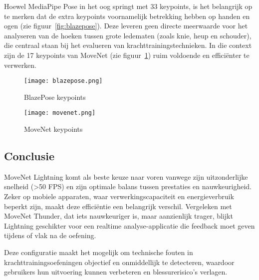 Hoewel MediaPipe Pose in het oog springt met 33 keypoints, is het belangrijk op te merken dat de extra keypoints voornamelijk betrekking hebben op handen en ogen (zie figuur~\ref{fig:blazepose}). 
Deze leveren geen directe meerwaarde voor het analyseren van de hoeken tussen grote ledematen (zoals knie, heup en schouder), die centraal staan bij het evalueren van krachttrainingstechnieken. 
In die context zijn de 17 keypoints van MoveNet (zie figuur~\ref{fig:movenet}) ruim voldoende en efficiënter te verwerken.

\begin{figure}[h]
  \centering
  \begin{minipage}{0.45\textwidth}
      \centering
      \texttt{[image: blazepose.png]}
      \caption[BlazePose keypoints]{\label{fig:blazepose}BlazePose keypoints \autocite{RoggioEtAl2024}}
  \end{minipage}
  \hfill %
  \begin{minipage}{0.45\textwidth}
      \centering
      \texttt{[image: movenet.png]}
      \caption[MoveNet keypoints]{\label{fig:movenet}MoveNet keypoints \autocite{RoggioEtAl2024}}
  \end{minipage}
\end{figure}  

\subsection{Conclusie}
MoveNet Lightning komt als beste keuze naar voren vanwege zijn uitzonderlijke snelheid (>50 FPS) en zijn optimale balans tussen prestaties en nauwkeurigheid. 
Zeker op mobiele apparaten, waar verwerkingscapaciteit en energieverbruik beperkt zijn, maakt deze efficiëntie een belangrijk verschil. 
Vergeleken met MoveNet Thunder, dat iets nauwkeuriger is, maar aanzienlijk trager, blijkt Lightning geschikter voor een realtime analyse-applicatie die feedback moet geven tijdens of vlak na de oefening.

\medskip

Deze configuratie maakt het mogelijk om technische fouten in krachttrainingsoefeningen objectief en onmiddellijk te detecteren, waardoor gebruikers hun uitvoering kunnen verbeteren en blessurerisico’s verlagen.
